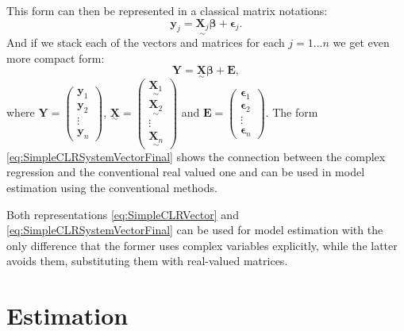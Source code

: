 \documentclass[
]{book}
\begin{document}
This form can then be represented in a classical matrix notations:
\begin{equation}
    \mathbf{y}_j = \underset{\sim}{\mathbf{X}_j} {\boldsymbol{\beta}} + \boldsymbol{\epsilon}_j .
    \label{eq:SimpleCLRSystemVector03}
\end{equation}
And if we stack each of the vectors and matrices for each \(j=1 \dots n\) we get even more compact form:
\begin{equation}
    \mathbf{Y} = \underset{\sim}{\mathbf{X}} \boldsymbol{\beta} + \mathbf{E} ,
    \label{eq:SimpleCLRSystemVectorFinal}
\end{equation}
where \(\mathbf{Y}=\begin{pmatrix}\mathbf{y}_1 \\ \mathbf{y}_2\\ \vdots \\ \mathbf{y}_n \end{pmatrix}\), \(\underset{\sim}{\mathbf{X}}=\begin{pmatrix} \underset{\sim}{\mathbf{X}_1} \\ \underset{\sim}{\mathbf{X}_2} \\ \vdots \\ \underset{\sim}{\mathbf{X}_n} \end{pmatrix}\) and \(\mathbf{E}=\begin{pmatrix}\boldsymbol{\epsilon}_1 \\ \boldsymbol{\epsilon}_2\\ \vdots \\ \boldsymbol{\epsilon}_n \end{pmatrix}\). The form \eqref{eq:SimpleCLRSystemVectorFinal} shows the connection between the complex regression and the conventional real valued one and can be used in model estimation using the conventional methods.

Both representations \eqref{eq:SimpleCLRVector} and \eqref{eq:SimpleCLRSystemVectorFinal} can be used for model estimation with the only difference that the former uses complex variables explicitly, while the latter avoids them, substituting them with real-valued matrices.

\hypertarget{SCLREstimation}{%
\section{Estimation}\label{SCLREstimation}}
\end{document}

